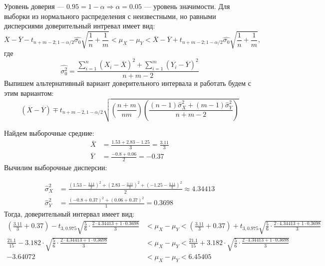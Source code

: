 \documentclass{article}
\begin{document}
Уровень доверия — $0.95=1-\alpha\Longrightarrow\alpha=0.05$ — уровень значимости. Для выборки из нормального распределения с неизвестными, но равными дисперсиями доверительный интревал имеет вид:
\begin{equation*}
    \overline{X}-\overline{Y}-t_{n+m-2;1-\alpha/2}\widehat{\sigma_0}\sqrt{\frac{1}{n}+\frac{1}{m}}<\mu_X-\mu_Y<\overline{X}-\overline{Y}+t_{n+m-2;1-\alpha/2}\widehat{\sigma_0}\sqrt{\frac{1}{n}+\frac{1}{m}},
\end{equation*}
где 
\begin{equation*}
    \widehat{\sigma^2_0}=\frac{\sum_{i=1}^{n}\left(X_i-\overline{X}\right)^2+\sum_{i=1}^{m}\left(Y_i-\overline{Y}\right)^2}{n+m-2}
\end{equation*}
Выпишем альтернативный вариант доверительного интервала и работать будем с этим вариантом:
\begin{equation*}
    (\overline{X}-\overline{Y})\mp t_{n+m-2,1-\alpha / 2} \sqrt{\left(\frac{n+m}{n m}\right)\left(\frac{(n-1) \hat{\sigma}_X^2+(m-1) \hat{\sigma}_Y^2}{n+m-2}\right)}
\end{equation*}

Найдем выборочные средние:
\begin{equation*}
    \begin{aligned}
        \overline{X}&=\frac{1.53+2.83-1.25}{3}=\frac{3.11}{3}\\
        \overline{Y}&=\frac{-0.8+0.06}{2}=-0.37
    \end{aligned}
\end{equation*}
Вычилим выборочные дисперсии:

\begin{equation*}
    \begin{aligned}
        \widehat{\sigma}^2_X&=\frac{(1.53-\frac{3.11}{3})^2+(2.83-\frac{3.11}{3})^2+(-1.25-\frac{3.11}{3})^2}{2}\approx4.34413\\
        \widehat{\sigma}^2_Y&=\frac{(-0.8+0.37)^2+(0.06+0.37)^2}{1}=0.3698
    \end{aligned}
\end{equation*}
Тогда, доверительный интервал имеет вид:
\begin{equation*}
    \begin{aligned}
        \left(\frac{3.11}{3}+0.37\right)- t_{3,0.975} \sqrt{\frac{5}{6}\cdot\frac{2\cdot4.34413+1\cdot 0.3698}{3}}&<\mu_X-\mu_Y<\left(\frac{3.11}{3}+0.37\right)+ t_{3,0.975} \sqrt{\frac{5}{6}\cdot\frac{2\cdot4.34413+1\cdot 0.3698}{3}}\\
        \frac{21.1}{15}-3.182\cdot\sqrt{\frac{5}{6}\cdot\frac{2\cdot4.34413+1\cdot 0.3698}{3}}&<\mu_X-\mu_Y<\frac{21.1}{15}+3.182\cdot\sqrt{\frac{5}{6}\cdot\frac{2\cdot4.34413+1\cdot 0.3698}{3}}\\
        -3.64072&<\mu_X-\mu_Y<6.45405
    \end{aligned}
\end{equation*}
\end{document}
